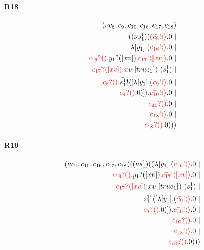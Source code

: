 \documentclass{article}
\begin{document}
\paragraph{R18}
\begin{align*}
 (\nu c_{8},c_{9},c_{10},c_{16},c_{17},c_{18}) \\ ( (\nu s^{1}_{1})((\color{red}\bar{c_{8}}! \langle  \rangle \color{black}.0  \ | \\  \lambda [y_{1}].(\color{red}\bar{c_{16}}! \langle  \rangle \color{black}.0  \ | \\ \color{red}c_{16}?().\color{black}\color{black}y_{1}?([xv]).\color{black}\color{red}\bar{c_{17}}! \langle [xv] \rangle \color{black}.0  \ | \\ \color{red}c_{17}?([xv]).\color{black}xv \ [true_{1}]) \ (s^{1}_{1}) \ | \\ \color{red}c_{8}?().\color{black}\color{black}\bar{s^{1}_{1}}! \langle [ \lambda [y_{1}].(\color{red}\bar{c_{9}}! \langle  \rangle \color{black}.0  \ | \\ \color{red}c_{9}?().\color{black}0 )] \rangle \color{black}.\color{red}\bar{c_{10}}! \langle  \rangle \color{black}.0  \ | \\ \color{red}c_{10}?().\color{black}0  \ | \\ \color{red}\bar{c_{18}}! \langle  \rangle \color{black}.0  \ | \\ \color{red}c_{18}?().\color{black}0 )))
\end{align*}
\paragraph{R19}
\begin{align*}
 (\nu c_{9},c_{10},c_{16},c_{17},c_{18})( (\nu s^{1}_{1})(( \lambda [y_{1}].(\color{red}\bar{c_{16}}! \langle  \rangle \color{black}.0  \ | \\ \color{red}c_{16}?().\color{black}\color{black}y_{1}?([xv]).\color{black}\color{red}\bar{c_{17}}! \langle [xv] \rangle \color{black}.0  \ | \\ \color{red}c_{17}?([xv]).\color{black}xv \ [true_{1}]) \ (s^{1}_{1}) \ | \\ \color{black}\bar{s^{1}_{1}}! \langle [ \lambda [y_{1}].(\color{red}\bar{c_{9}}! \langle  \rangle \color{black}.0  \ | \\ \color{red}c_{9}?().\color{black}0 )] \rangle \color{black}.\color{red}\bar{c_{10}}! \langle  \rangle \color{black}.0  \ | \\ \color{red}c_{10}?().\color{black}0  \ | \\ \color{red}\bar{c_{18}}! \langle  \rangle \color{black}.0  \ | \\ \color{red}c_{18}?().\color{black}0 )))
\end{align*}
\end{document}

